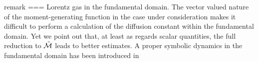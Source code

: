 remark === {Lorentz gas in the fundamental domain.}{
The vector valued nature of the moment-generating function  in
the case under consideration makes it difficult to perform a calculation of
the diffusion constant within the fundamental domain.
Yet we point out that, at least as regards scalar quantities, the
full reduction to $\tilde{{\cal M}}$ leads to better estimates.
A proper symbolic dynamics in the fundamental domain has been
introduced in %
\PublicPrivate{.}{%
, numerical estimates for scalar
quantities are reported in \reftab{t-diff-5a}, taken from \refref{CGS92}.
      }%
%
}
